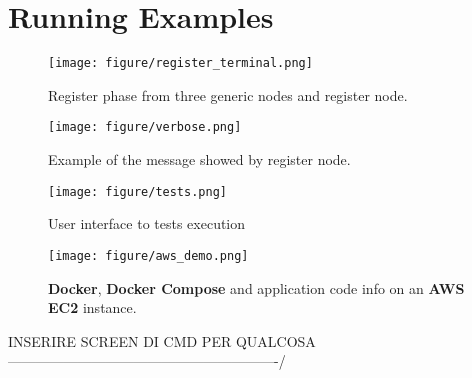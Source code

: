 \documentclass[conference]{IEEEtran}
\begin{document}
\section{Running Examples}

\begin{figure}[htb]\label{fig:register}
\texttt{[image: figure/register\_terminal.png]}
\caption{Register phase from three generic nodes and register node.}
\end{figure}

\begin{figure}[htb]\label{fig:verbose}
\texttt{[image: figure/verbose.png]}
\caption{Example of the message showed by register node.}
\end{figure}

\begin{figure}[htb]\label{fig:tests}
\texttt{[image: figure/tests.png]}
\caption{User interface to tests execution}
\end{figure}

\begin{figure}[htb]\label{fig:aws}
\texttt{[image: figure/aws\_demo.png]}
\caption{\textbf{Docker}, \textbf{Docker Compose} and application code info on an \textbf{AWS EC2} instance.}
\end{figure}
INSERIRE SCREEN DI CMD PER QUALCOSA----------------------------------------------------------/
\printbibliography
\end{document}
